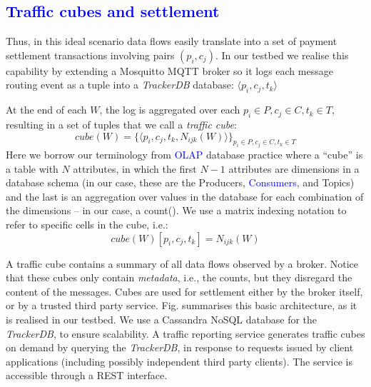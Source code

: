 \documentclass[chi_draft]{sigchi}
\begin{document}
\textcolor{blue}{\subsection{Traffic cubes and settlement}}
Thus, in this ideal scenario data flows easily translate into a set of payment settlement transactions involving pairs $(p_i, c_j)$.
In our testbed we realise this capability by extending a Mosquitto MQTT broker so it logs each message routing event as a tuple into a \textit{TrackerDB} database:
$ \langle p_i, c_j, t_k \rangle $

At the end of each $W$, the log is aggregated over each $p_i \in P, c_j \in C, t_k \in T$, resulting in a set of tuples that we call a \textit{traffic cube}:
\begin{equation}\label{eq:cube}
\mathit{cube}(W) = \{ \langle p_i, c_j, t_k, N_{ijk}(W) \rangle \}_{p_i \in P, c_j \in C, t_k \in T}
\end{equation}
Here we borrow our terminology from \textcolor{blue}{OLAP} database practice where a  ``cube'' is a table with $ N $ attributes, in which the first $ N-1 $ attributes are  dimensions in a database schema (in our case, these are the Producers, \textcolor{blue}{Consumers}, and Topics) and the last is an aggregation over values in the database for each combination of the dimensions -- in our case, a count().
We use a matrix indexing notation to refer to specific cells in the cube, i.e.:
\[ \mathit{cube}(W)[p_i, c_j, t_k] = N_{ijk}(W) \] 

A traffic cube contains a summary  of all data flows observed by a broker. Notice that these cubes only contain \textit{metadata}, i.e., the counts, but they disregard the content of the messages.
%
Cubes are used for settlement either by the broker itself, or by a trusted third party service. Fig.  summarises this basic architecture, as it is realised in our testbed. 
We use a Cassandra NoSQL database for the \textit{TrackerDB}, to ensure scalability. 
A traffic reporting service generates traffic cubes on demand by querying the \textit{TrackerDB}, in response to requests issued by client applications (including possibly independent third party clients). The service is accessible through a REST interface.
\end{document}
